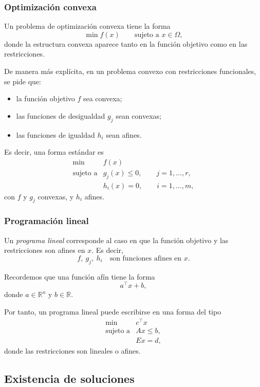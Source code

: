 \subsubsection{Optimización convexa}

Un problema de optimización convexa tiene la forma
\[
    \min f(x)
    \qquad
    \text{sujeto a } x\in \Omega,
\]
donde la estructura convexa aparece tanto en la función objetivo como en las restricciones.

De manera más explícita, en un problema convexo con restricciones funcionales, se pide que:
\begin{itemize}
    \item la función objetivo \(f\) sea convexa;
    \item las funciones de desigualdad \(g_j\) sean convexas;
    \item las funciones de igualdad \(h_i\) sean afines.
\end{itemize}

Es decir, una forma estándar es
\[
    \begin{array}{ll}
        \min & f(x)\\[1mm]
        \text{sujeto a} & g_j(x)\leq 0,\qquad j=1,\dots,r,\\
        & h_i(x)=0,\qquad i=1,\dots,m,
    \end{array}
\]
con \(f\) y \(g_j\) convexas, y \(h_i\) afines.

\subsubsection{Programación lineal}

Un \emph{programa lineal} corresponde al caso en que la función objetivo y las restricciones son afines en \(x\). Es decir,
\[
    f,\ g_j,\ h_i
    \quad
    \text{son funciones afines en } x.
\]

Recordemos que una función afín tiene la forma
\[
    a^\top x+b,
\]
donde \(a\in\mathbb{R}^n\) y \(b\in\mathbb{R}\).

Por tanto, un programa lineal puede escribirse en una forma del tipo
\[
    \begin{array}{ll}
        \min & c^\top x\\[1mm]
        \text{sujeto a} & Ax\leq b,\\
        & Ex=d,
    \end{array}
\]
donde las restricciones son lineales o afines.

\subsection{Existencia de soluciones}

